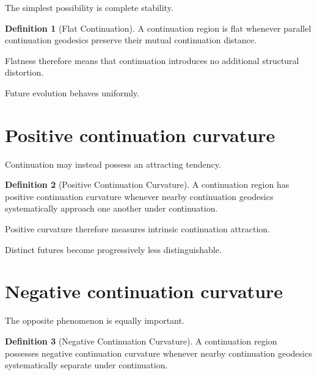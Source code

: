 \documentclass[13pt,openany]{book}
\theoremstyle{plain}
\theoremstyle{definition}
\newtheorem{definition}{Definition}[chapter]
\begin{document}
The simplest possibility is complete stability.

\begin{definition}[Flat Continuation]

A continuation region is flat whenever parallel continuation geodesics preserve their mutual continuation distance.

\end{definition}

Flatness therefore means that continuation introduces no additional structural distortion.

Future evolution behaves uniformly.


\section{Positive continuation curvature}

Continuation may instead possess an attracting tendency.

\begin{definition}[Positive Continuation Curvature]

A continuation region has positive continuation curvature whenever nearby continuation geodesics systematically approach one another under continuation.

\end{definition}

Positive curvature therefore measures intrinsic continuation attraction.

Distinct futures become progressively less distinguishable.


\section{Negative continuation curvature}

The opposite phenomenon is equally important.

\begin{definition}[Negative Continuation Curvature]

A continuation region possesses negative continuation curvature whenever nearby continuation geodesics systematically separate under continuation.

\end{definition}
\end{document}
